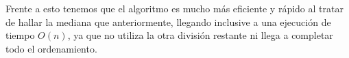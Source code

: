 \documentclass[final,a4paper,romanappendices]{IEEEtran}\usepackage[]{graphicx}\usepackage[]{color}
\theoremstyle{definition}
\begin{document}
Frente a esto tenemos que el algoritmo es mucho más eficiente y rápido al tratar de hallar la mediana que anteriormente, llegando inclusive a una ejecución de tiempo $O(n)$, ya que no utiliza la otra división restante ni llega a completar todo el ordenamiento.


\nocite{*}
\printbibliography
\end{document}

